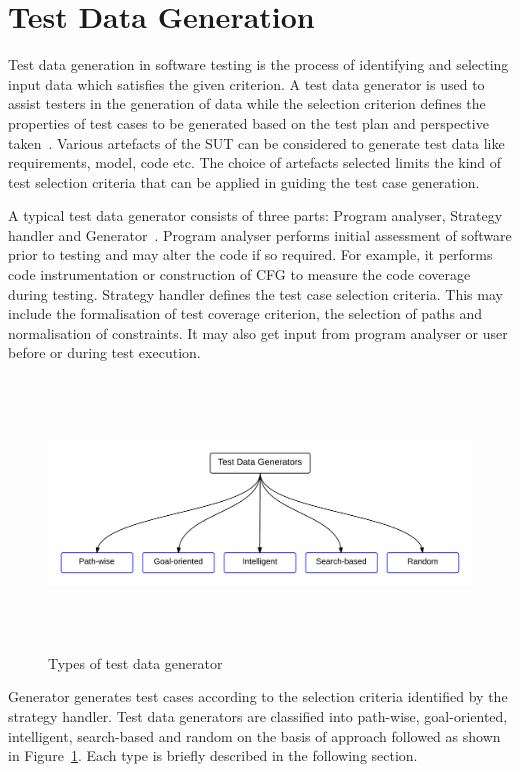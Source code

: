 \section{Test Data Generation}
Test data generation in software testing is the process of identifying and selecting input data which satisfies the given criterion. A test data generator is used to assist testers in the generation of data while the selection criterion defines the properties of test cases to be generated based on the test plan and perspective taken~\cite{korel1990automated}. Various artefacts of the SUT can be considered to generate test data like requirements, model, code etc. The choice of artefacts selected limits the kind of test selection criteria that can be applied in guiding the test case generation. 

A typical test data generator consists of three parts: Program analyser, Strategy handler and Generator~\cite{edvardsson1999survey}. Program analyser performs initial assessment of software prior to testing and may alter the code if so required. For example, it performs code instrumentation or construction of CFG to measure the code coverage during testing. Strategy handler defines the test case selection criteria. This may include the formalisation of test coverage criterion, the selection of paths and normalisation of constraints. It may also get input from program analyser or user before or during test execution.

\bigskip
\begin{figure}[h]
	\centering
	\centerline{\includegraphics[width=16.5cm, height=7.2cm ]{chapter2/Generators.png}}
	\bigskip
	\caption{Types of test data generator}
	\label{testDataGenerators_2}
\end{figure}
\bigskip

Generator generates test cases according to the selection criteria identified by the strategy handler. Test data generators are classified into path-wise, goal-oriented, intelligent, search-based and random on the basis of approach followed as shown in Figure~\ref{testDataGenerators_2}. Each type is briefly described in the following section.

